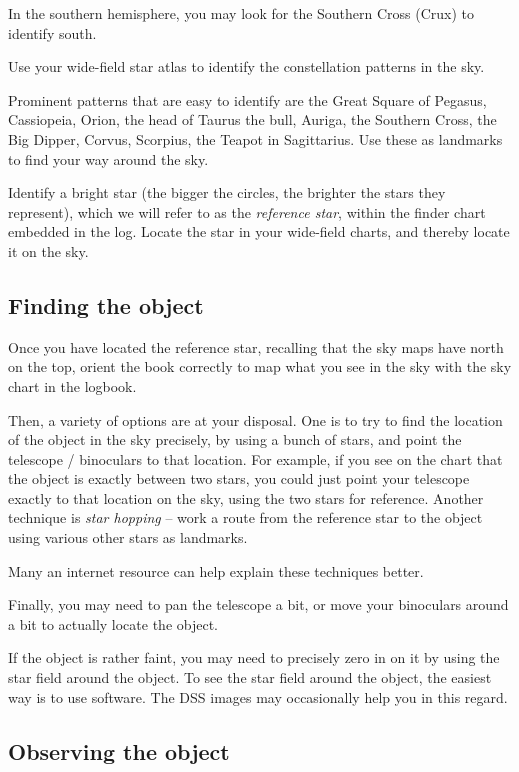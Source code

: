 In the southern hemisphere, you may look for the Southern Cross (Crux)
to identify south.

Use your wide-field star atlas to identify the constellation patterns
in the sky.

Prominent patterns that are easy to identify are the Great Square of
Pegasus, Cassiopeia, Orion, the head of Taurus the bull, Auriga, the
Southern Cross, the Big Dipper, Corvus, Scorpius, the Teapot in
Sagittarius. Use these as landmarks to find your way around the sky.

Identify a bright star (the bigger the circles, the brighter the stars
they represent), which we will refer to as the \emph{reference star},
within the finder chart embedded in the log. Locate the star in your
wide-field charts, and thereby locate it on the sky.

\subsection{Finding the object}

Once you have located the reference star, recalling that the sky maps
have north on the top, orient the book correctly to map what you see
in the sky with the sky chart in the logbook.

Then, a variety of options are at your disposal. One is to try to find
the location of the object in the sky precisely, by using a bunch of
stars, and point the telescope / binoculars to that location. For
example, if you see on the chart that the object is exactly between
two stars, you could just point your telescope exactly to that
location on the sky, using the two stars for reference. Another
technique is \emph{star hopping} -- work a route from the reference
star to the object using various other stars as landmarks.

Many an internet resource can help explain these techniques better.

Finally, you may need to pan the telescope a bit, or move your
binoculars around a bit to actually locate the object.

If the object is rather faint, you may need to precisely zero in on it
by using the star field around the object. To see the star field
around the object, the easiest way is to use software. The DSS images
may occasionally help you in this regard.

\subsection{Observing the object}

